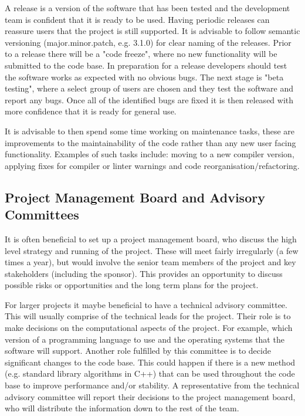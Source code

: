 \documentclass[jnr]{iosart2x}
\begin{document}
A release is a version of the software that has been tested and the development team is confident that it is ready to be used.
Having periodic releases can reassure users that the project is still supported.
It is advisable to follow semantic versioning \cite{Semantic_Versioning} (major.minor.patch, e.g. 3.1.0) for clear naming of the releases.
Prior to a release there will be a "code freeze", where no new functionality will be submitted to the code base.
In preparation for a release developers should test the software works as expected with no obvious bugs.
The next stage is "beta testing", where a select group of users are chosen and they test the software and report any bugs.
Once all of the identified bugs are fixed it is then released with more confidence that it is ready for general use.

It is advisable to then spend some time working on maintenance tasks, these are improvements to the maintainability of the code rather than any new user facing functionality.
Examples of such tasks include: moving to a new compiler version, applying fixes for compiler or linter warnings and code reorganisation/refactoring.

\subsection{Project Management Board and Advisory Committees}
\label{PM big}

It is often beneficial to set up a project management board, who discuss the high level strategy and running of the project.
These will meet fairly irregularly (a few times a year), but would involve the senior team members of the project and key stakeholders (including the sponsor).
This provides an opportunity to discuss possible risks or opportunities and the long term plans for the project.

For larger projects it maybe beneficial to have a technical advisory committee.
This will usually comprise of the technical leads for the project.
Their role is to make decisions on the computational aspects of the project.
For example, which version of a programming language to use and the operating systems that the software will support.
Another role fulfilled by this committee is to decide significant changes to the code base.
This could happen if there is a new method (e.g. standard library algorithms in C++) that can be used throughout the code base to improve performance and/or stability.
A representative from the technical advisory committee will report their decisions to the project management board, who will distribute the information down to the rest of the team.
\end{document}
